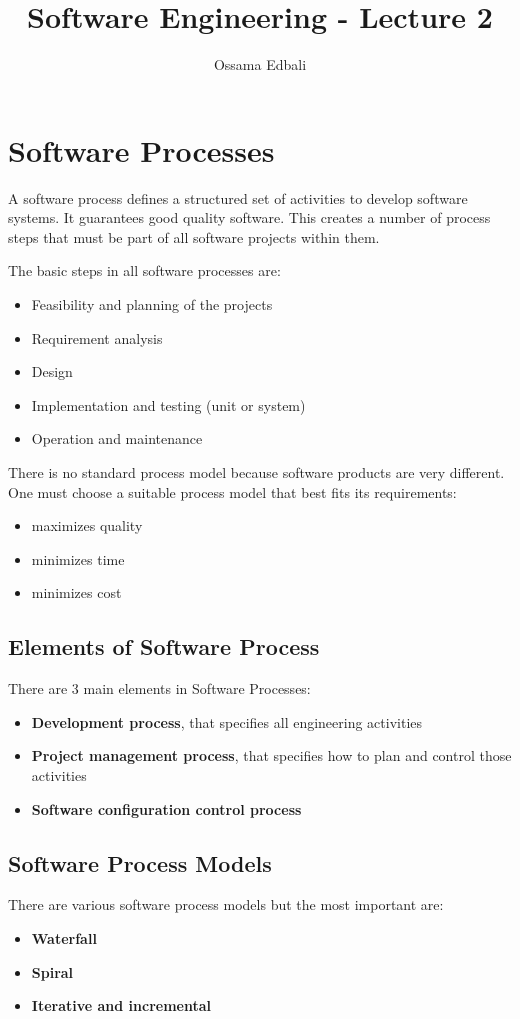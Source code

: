 \documentclass{article}
\title{Software Engineering - Lecture 2}
\author{Ossama Edbali}
\begin{document}
	
	\maketitle	
	
	\section{Software Processes}	
	A software process defines a structured set of activities to develop software systems. It guarantees
	good quality software. This creates a number of process steps that must
	be part of all software projects within them.
	
	The basic steps in all software processes are:
	\begin{itemize}
		\item Feasibility and planning of the projects
		\item Requirement analysis
		\item Design
		\item Implementation and testing (unit or system)
		\item Operation and maintenance
	\end{itemize}
	
	There is no standard process model because software products are very different. One must choose a
	suitable process model that best fits its requirements:
	\begin{itemize}
		\item maximizes quality
		\item minimizes time
		\item minimizes cost
	\end{itemize}
	
	\subsection*{Elements of Software Process}
	There are 3 main elements in Software Processes:
	\begin{itemize}
		\item \textbf{Development process}, that specifies all engineering activities
		\item \textbf{Project management process}, that specifies how to plan and control those activities
		\item \textbf{Software configuration control process}
	\end{itemize}
	
	\subsection*{Software Process Models}
	There are various software process models but the most important are:
	\begin{itemize}
		\item \textbf{Waterfall}
		\item \textbf{Spiral}
		\item \textbf{Iterative and incremental}
	\end{itemize}
	
\end{document}
